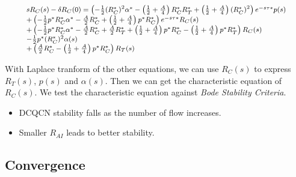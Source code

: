 \begin{equation}
\small
\begin{array}{l}
s{R_C}(s) - \delta {R_C}(0) = \left( { - \frac{1}{2}{{(R_C^*)}^2}{\alpha ^*} - \left( {\frac{1}{2} + \frac{A}{4}} \right)R_C^*R_T^* + \left( {\frac{1}{2} + \frac{A}{4}} \right){{(R_C^*)}^2}} \right){e^{ - s\tau *}}p(s)\\
 + \left( { - \frac{1}{2}{p^*}R_C^*{\alpha ^*} - \frac{A}{2}R_C^* + \left( {\frac{1}{2} + \frac{A}{4}} \right){p^*}R_C^*} \right){e^{ - s\tau *}}{R_C}(s)\\
 + \left( { - \frac{1}{2}{p^*}R_C^*{\alpha ^*} - \frac{A}{2}R_C^* + \frac{A}{2}R_T^* + \left( {\frac{1}{2} + \frac{A}{4}} \right){p^*}R_C^* - \left( {\frac{1}{2} + \frac{A}{4}} \right){p^*}R_T^*} \right){R_C}(s)\\
 - \frac{1}{2}{p^*}{(R_C^*)^2}\alpha (s)\\
 + \left( {\frac{A}{2}R_C^* - \left( {\frac{1}{2} + \frac{A}{4}} \right){p^*}R_C^*} \right){R_T}(s)
\end{array}
\end{equation}

With Laplace tranform of the other equations, we can use ${R_C}(s)$ to express ${R_T}(s)$, $p(s)$ and $\alpha (s)$.
Then we can get the characteristic equation of ${R_C}(s)$. We test the characteristic equation against {\em Bode Stability
Criteria}. 

\begin{itemize}
\item DCQCN stability falls as the number of flow increases.
\item Smaller $R_{AI}$ leads to better stability.
\end{itemize}

\subsection{Convergence}
